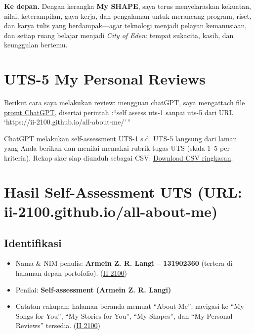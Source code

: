 \documentclass[
  letterpaper,
  DIV=11,
  numbers=noendperiod]{scrreprt}
\providecommand{\tightlist}{%
  \setlength{\itemsep}{0pt}\setlength{\parskip}{0pt}}\usepackage{longtable,booktabs,array}
\begin{document}
\textbf{Ke depan.} Dengan kerangka \textbf{My SHAPE}, saya terus
menyelaraskan kekuatan, nilai, keterampilan, gaya kerja, dan pengalaman
untuk merancang program, riset, dan karya tulis yang berdampak---agar
teknologi menjadi pelayan kemanusiaan, dan setiap ruang belajar menjadi
\emph{City of Eden}: tempat sukacita, kasih, dan keunggulan bertemu.


\chapter{UTS-5 My Personal Reviews}\label{uts-5-my-personal-reviews}

Berikut cara saya melakukan review: mengguan chatGPT, saya mengattach
\href{skor_uts.pdf}{file promt ChatGPT}, disertai perintah :``self
assess uts-1 sanpai uts-5 dari URL
`https://ii-2100.github.io/all-about-me/'\,''

ChatGPT melakukan self-assessment UTS-1 s.d. UTS-5 langsung dari laman
yang Anda berikan dan menilai memakai rubrik tugas UTS (skala 1--5 per
kriteria). Rekap skor siap diunduh sebagai CSV:
\href{sandbox:/mnt/data/UTS_self_assessment.csv}{Download CSV
ringkasan}.


\chapter{Hasil Self-Assessment UTS (URL:
ii-2100.github.io/all-about-me)}\label{hasil-self-assessment-uts-url-ii-2100.github.ioall-about-me}

\section{Identifikasi}\label{identifikasi}

\begin{itemize}
\tightlist
\item
  Nama \& NIM penulis: \textbf{Armein Z. R. Langi -- 131902360} (tertera
  di halaman depan portofolio).
  (\href{https://ii-2100.github.io/all-about-me/}{II 2100})
\item
  Penilai: \textbf{Self-assessment (Armein Z. R. Langi)}
\item
  Catatan cakupan: halaman beranda memuat ``About Me''; navigasi ke ``My
  Songs for You'', ``My Stories for You'', ``My Shapes'', dan ``My
  Personal Reviews'' tersedia.
  (\href{https://ii-2100.github.io/all-about-me/}{II 2100})
\end{itemize}
\end{document}
